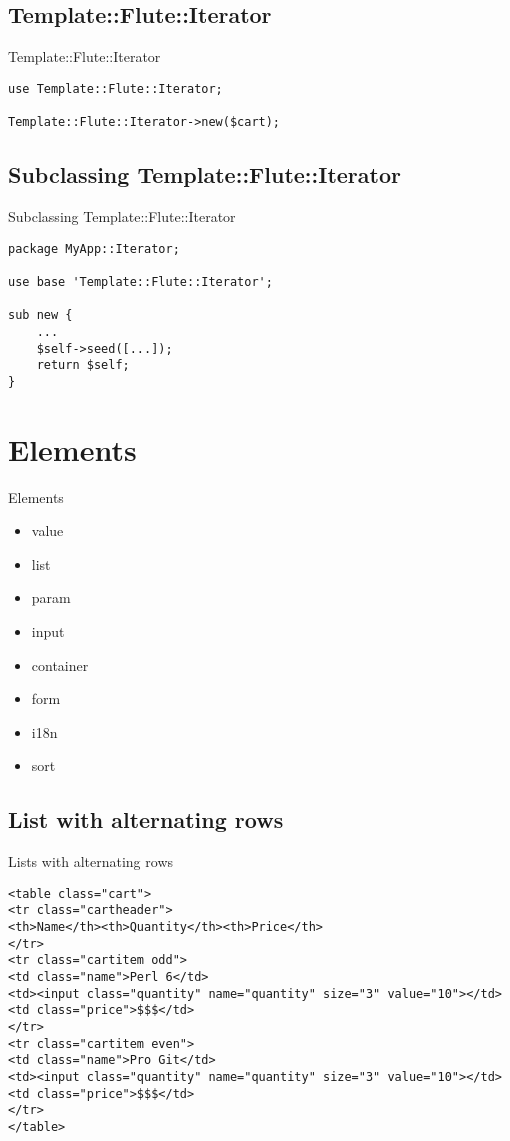 \subsection{Template::Flute::Iterator}
\begin{frame}[fragile]{Template::Flute::Iterator}
\begin{lstlisting}
use Template::Flute::Iterator;

Template::Flute::Iterator->new($cart);
\end{lstlisting}
\end{frame}

\subsection{Subclassing Template::Flute::Iterator}
\begin{frame}[fragile]{Subclassing Template::Flute::Iterator}
\begin{lstlisting}
package MyApp::Iterator;

use base 'Template::Flute::Iterator';

sub new {
    ...
    $self->seed([...]);
    return $self;
}
\end{lstlisting}
\end{frame}

\section{Elements}
\begin{frame}{Elements}
\begin{itemize}
\item value
\item list
\item param
\item input
\item container
\item form
\item i18n
\item sort
\end{itemize}
\end{frame}

\subsection{List with alternating rows}
\begin{frame}[fragile]{Lists with alternating rows}
\begin{lstlisting}
<table class="cart">
<tr class="cartheader">
<th>Name</th><th>Quantity</th><th>Price</th>
</tr>
<tr class="cartitem odd">
<td class="name">Perl 6</td>
<td><input class="quantity" name="quantity" size="3" value="10"></td>
<td class="price">$$$</td>
</tr>
<tr class="cartitem even">
<td class="name">Pro Git</td>
<td><input class="quantity" name="quantity" size="3" value="10"></td>
<td class="price">$$$</td>
</tr>
</table>
\end{lstlisting}
\end{frame}

